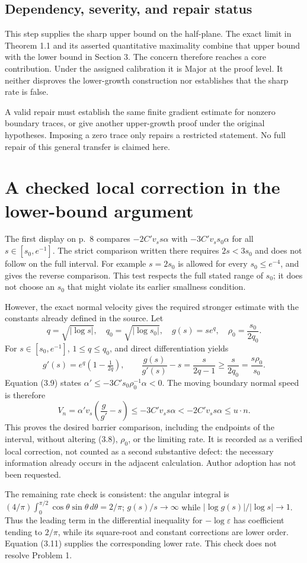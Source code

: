\documentclass[10pt]{article}
\begin{document}
\subsection*{Dependency, severity, and repair status}
This step supplies the sharp upper bound on the half-plane. The exact limit in Theorem 1.1 and its asserted quantitative maximality combine that upper bound with the lower bound in Section 3. The concern therefore reaches a core contribution. Under the assigned calibration it is Major at the proof level. It neither disproves the lower-growth construction nor establishes that the sharp rate is false.\par
A valid repair must establish the same finite gradient estimate for nonzero boundary traces, or give another upper-growth proof under the original hypotheses. Imposing a zero trace only repairs a restricted statement. No full repair of this general transfer is claimed here.\par
\section*{A checked local correction in the lower-bound argument}
The first display on p. 8 compares \(-2C'v_s s\alpha\) with \(-3C'v_s s_0\alpha\) for all \(s\in[s_0,e^{-1}]\). The strict comparison written there requires \(2s<3s_0\) and does not follow on the full interval. For example \(s=2s_0\) is allowed for every \(s_0\le e^{-4}\), and gives the reverse comparison. This test respects the full stated range of \(s_0\); it does not choose an \(s_0\) that might violate its earlier smallness condition.\par
However, the exact normal velocity gives the required stronger estimate with the constants already defined in the source. Let \[q=\sqrt{|\log s|},\quad q_0=\sqrt{|\log s_0|},\quad
 g(s)=s e^q,\quad \rho_0=\frac{s_0}{2q_0}.\] For \(s\in[s_0,e^{-1}]\), \(1\le q\le q_0\), and direct differentiation yields \[g'(s)=e^q(1-\tfrac1{2q}),\qquad
 \frac{g(s)}{g'(s)}-s=\frac{s}{2q-1}
 \ge \frac{s}{2q_0}=\frac{s\rho_0}{s_0}.\] Equation (3.9) states \(\alpha'\le-3C's_0\rho_0^{-1}\alpha<0\). The moving boundary normal speed is therefore \[V_n=\alpha'v_s\left(\frac{g}{g'}-s\right)
 \le-3C'v_s s\alpha
 <-2C'v_s s\alpha
 \le u\cdot n.\] This proves the desired barrier comparison, including the endpoints of the interval, without altering (3.8), \(\rho_0\), or the limiting rate. It is recorded as a verified local correction, not counted as a second substantive defect: the necessary information already occurs in the adjacent calculation. Author adoption has not been requested.\par
The remaining rate check is consistent: the angular integral is \((4/\pi)\int_0^{\pi/2}\cos\theta\sin\theta\,d\theta=2/\pi\); \(g(s)/s\to\infty\) while \(|\log g(s)|/|\log s|\to1\). Thus the leading term in the differential inequality for \(-\log\varepsilon\) has coefficient tending to \(2/\pi\), while its square-root and constant corrections are lower order. Equation (3.11) supplies the corresponding lower rate. This check does not resolve Problem 1.\par
\end{document}
